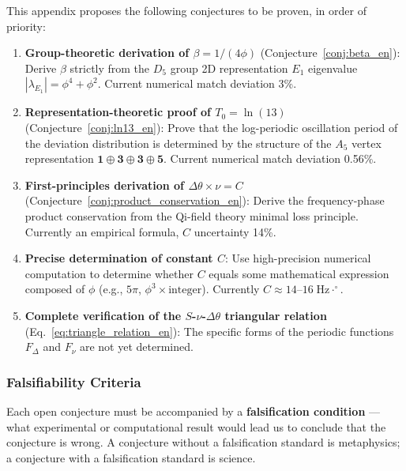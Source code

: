This appendix proposes the following conjectures to be proven, in order of priority:

\begin{enumerate}
\item \textbf{Group-theoretic derivation of $\beta = 1/(4\phi)$} (Conjecture~\ref{conj:beta_en}): Derive $\beta$ strictly from the $D_5$ group 2D representation $E_1$ eigenvalue $|\lambda_{E_1}| = \phi^4 + \phi^2$. Current numerical match deviation 3\%.

\item \textbf{Representation-theoretic proof of $T_0 = \ln(13)$} (Conjecture~\ref{conj:ln13_en}): Prove that the log-periodic oscillation period of the deviation distribution is determined by the structure of the $A_5$ vertex representation $\mathbf{1}\oplus\mathbf{3}\oplus\mathbf{3}\oplus\mathbf{5}$. Current numerical match deviation 0.56\%.

\item \textbf{First-principles derivation of $\Delta\theta \times \nu = C$} (Conjecture~\ref{conj:product_conservation_en}): Derive the frequency-phase product conservation from the Qi-field theory minimal loss principle. Currently an empirical formula, $C$ uncertainty 14\%.

\item \textbf{Precise determination of constant $C$}: Use high-precision numerical computation to determine whether $C$ equals some mathematical expression composed of $\phi$ (e.g., $5\pi$, $\phi^3 \times \text{integer}$). Currently $C \approx 14$--$16\;\text{Hz}\cdot^\circ$.

\item \textbf{Complete verification of the $S$-$\nu$-$\Delta\theta$ triangular relation} (Eq.~\ref{eq:triangle_relation_en}): The specific forms of the periodic functions $F_\Delta$ and $F_\nu$ are not yet determined.
\end{enumerate}

\subsubsection{Falsifiability Criteria}
\label{subsubsec:falsifiability_en}

Each open conjecture must be accompanied by a \textbf{falsification condition} --- what experimental or computational result would lead us to conclude that the conjecture is wrong. A conjecture without a falsification standard is metaphysics; a conjecture with a falsification standard is science.

